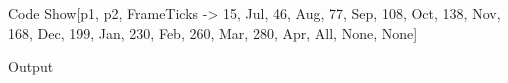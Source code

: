 \documentclass[a4paper,12pt]{article}
\begin{document}
\begin{mmaCell}[functionlocal=y]{Code}
  Show[p1, p2, FrameTicks -> {{{15, Jul}, {46, Aug}, {77, Sep}, 
  {108, Oct}, {138, Nov}, {168, Dec}, {199, Jan}, {230, Feb},
  {260, Mar}, {280, Apr}}, All, None, None}]
\end{mmaCell}


 \begin{mmaCell}[moregraphics={moreig={scale=.4}}]{Output}
 \end{mmaCell}
\end{document}
